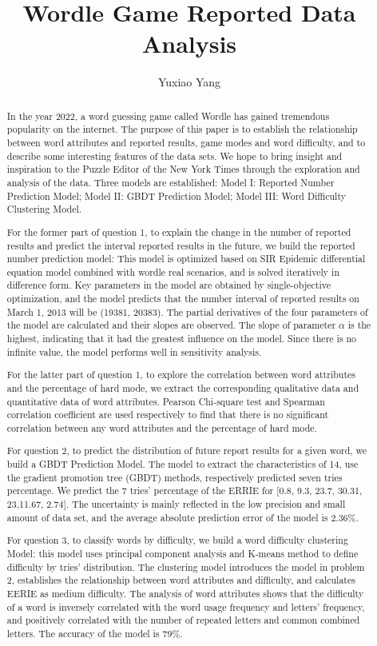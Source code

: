 \documentclass[
  journal=medium,
  manuscript=Report,
  year=2023,
  volume=37,
]{cup-journal}
\title{Wordle Game Reported Data Analysis}
\author{Yuxiao Yang}
\affiliation{Xi'an Jiaotong University, Xi'an, China}
\begin{document}
\begin{abstract}
    In the year 2022, a word guessing game called Wordle has gained tremendous popularity on the internet. The purpose of this paper is to establish the relationship between word attributes and reported results, game modes and word difficulty, and to describe some interesting features of the data sets. We hope to bring insight and inspiration to the Puzzle Editor of the New York Times through the exploration and analysis of the data. Three models are established: Model I: Reported Number Prediction Model; Model II: GBDT Prediction Model; Model III: Word Difficulty Clustering Model. 
    
    For the former part of question 1, to explain the change in the number of reported results and predict the interval reported results in the future, we build the reported number prediction model: This model is optimized based on SIR Epidemic differential equation model combined with wordle real scenarios, and is solved iteratively in difference form. Key parameters in the model are obtained by single-objective optimization, and the model predicts that the number interval of reported results on March 1, 2013 will be (19381, 20383). The partial derivatives of the four parameters of the model are calculated and their slopes are observed. The slope of parameter $\alpha$ is the highest, indicating that it had the greatest influence on the model. Since there is no infinite value, the model performs well in sensitivity analysis. 
    
    For the latter part of question 1, to explore the correlation between word attributes and the percentage of hard mode, we extract the corresponding qualitative data and quantitative data of word attributes. Pearson Chi-square test and Spearman correlation coefficient are used respectively to find that there is no significant correlation between any word attributes and the percentage of hard mode. 

    For question 2, to predict the distribution of future report results for a given word, we build a GBDT Prediction Model. The model to extract the characteristics of 14, use the gradient promotion tree (GBDT) methods, respectively predicted seven tries percentage. We predict the 7 tries’ percentage of the ERRIE for [0.8, 9.3, 23.7, 30.31, 23,11.67, 2.74]. The uncertainty is mainly reflected in the low precision and small amount of data set, and the average absolute prediction error of the model is 2.36\%.

    For question 3, to classify words by difficulty, we build a word difficulty clustering Model: this model uses principal component analysis and K-means method to define difficulty by tries’ distribution. The clustering model introduces the model in problem 2, establishes the relationship between word attributes and difficulty, and calculates EERIE as medium difficulty. The analysis of word attributes shows that the difficulty of a word is inversely correlated with the word usage frequency and letters’ frequency, and positively correlated with the number of repeated letters and common combined letters. The accuracy of the model is 79\%. 


\end{abstract}
\end{document}
